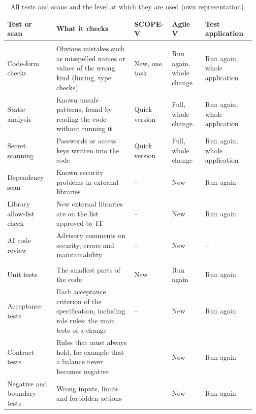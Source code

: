 \documentclass[10pt,a4paper]{article}
\begin{document}
\begin{table}[htbp]
    \centering
    \footnotesize
    \caption{All tests and scans and the level at which they are used (own
    representation).}
    \label{tab:app-testing-all-tests}
    \begin{tabularx}{\textwidth}{>{\raggedright\arraybackslash}p{2.9cm} Y
        >{\raggedright\arraybackslash}p{1.9cm}
        >{\raggedright\arraybackslash}p{1.9cm}
        >{\raggedright\arraybackslash}p{2.1cm}}
    \toprule
    \textbf{Test or scan} & \textbf{What it checks} & \textbf{SCOPE-V} &
        \textbf{Agile V} & \textbf{Test application} \\
    \midrule
     \\
    \addlinespace[2pt]
    Code-form checks & Obvious mistakes such as misspelled names or values
        of the wrong kind (linting, type checks) & New, one task & Run
        again, whole change & Run again, whole application \\
    Static analysis & Known unsafe patterns, found by reading the code
        without running it & Quick version & Full, whole change & Run
        again, whole application \\
    Secret scanning & Passwords or access keys written into the code &
        Quick version & Full, whole change & Run again, whole application \\
    Dependency scan & Known security problems in external libraries & -- &
        New & Run again \\
    Library allow-list check & New external libraries are on the list
        approved by IT & -- & New & Run again \\
    AI code review & Advisory comments on security, errors and
        maintainability & -- & New & -- \\
    \midrule
     \\
    \addlinespace[2pt]
    Unit tests & The smallest parts of the code & New & Run again & Run
        again \\
    Acceptance tests & Each acceptance criterion of the specification,
        including role rules; the main tests of a change & -- & New & Run
        again \\
    Contract tests & Rules that must always hold, for example that a
        balance never becomes negative & -- & New & Run again \\
    Negative and boundary tests & Wrong inputs, limits and forbidden
        actions & -- & New & Run again \\

\end{tabularx}
\end{table}
\end{document}
